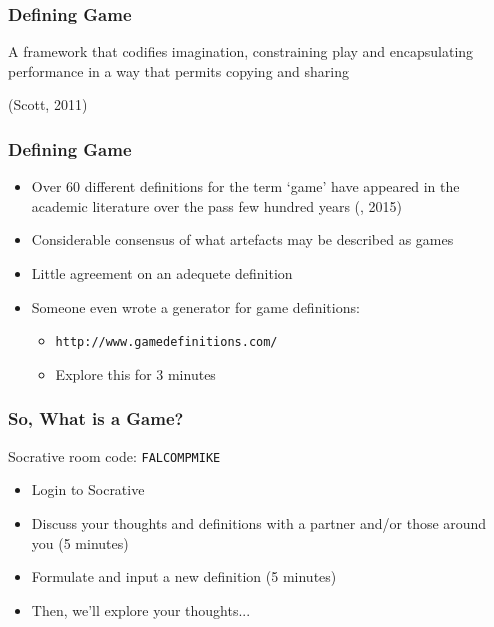 \documentclass[handout, xcolor={dvipsnames}]{beamer}\usepackage{etoolbox}\newtoggle{printable}\toggletrue{printable}
\newcommand{\socrative}{
	\begin{center}
		Socrative room code: \texttt{FALCOMPMIKE}
	\end{center}
}
\begin{document}
\begin{frame}
	\frametitle{Defining Game}
		
	\begin{center}
	\begin{huge}
	A framework that codifies imagination, constraining play and encapsulating performance in a way that permits copying and sharing
	\end{huge}
	
	\vspace{3em}
	
	(Scott, 2011)
	\end{center}

\end{frame}

\begin{frame}
	\frametitle{Defining Game}
	
		\begin{itemize}
		\item Over 60 different definitions for the term `game' have appeared in the academic literature over the pass few hundred years (, 2015)
		\item Considerable consensus of what artefacts may be described as games
		\item Little agreement on an adequete definition
		\item Someone even wrote a generator for game definitions:
		\begin{itemize}
		  \item \texttt{http://www.gamedefinitions.com/}
		  \item Explore this for 3 minutes
		\end{itemize}
	\end{itemize}

\end{frame}

\begin{frame}
	\frametitle{So, What is a Game?}
	
	\socrative
	
	\begin{itemize}
		\item Login to Socrative
		\item Discuss your thoughts and definitions with a partner and/or those around you (5 minutes)
		\item Formulate and input a new definition (5 minutes)
		\item Then, we'll explore your thoughts...
	\end{itemize}

\end{frame}
\end{document}
